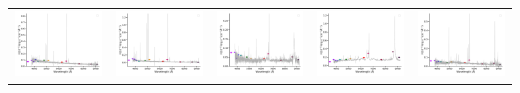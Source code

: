 \begin{center}
\begin{longtable}{l l l l l }
    \includegraphics[width=0.19\linewidth, clip]{Figs/Figs-sdss/spec-1106-52912-0194-STRIPE82-0129-031160.pdf} & \includegraphics[width=0.19\linewidth, clip]{Figs/Figs-sdss/spec-1106-52912-0456-STRIPE82-0130-042161.pdf} & \includegraphics[width=0.19\linewidth, clip]{Figs/Figs-sdss/spec-1115-52914-0588-STRIPE82-0108-009933.pdf} & \includegraphics[width=0.19\linewidth, clip]{Figs/Figs-sdss/spec-1116-52932-0478-STRIPE82-0104-027921.pdf} & \includegraphics[width=0.19\linewidth, clip]{Figs/Figs-sdss/spec-1117-52885-0395-STRIPE82-0100-021070.pdf} \\

\end{longtable}
\end{center}
